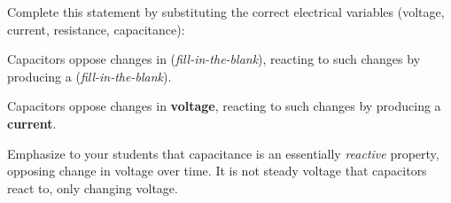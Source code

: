 

Complete this statement by substituting the correct electrical variables (voltage, current, resistance, capacitance):

\vskip 10pt {\narrower \noindent \baselineskip5pt
Capacitors oppose changes in ({\it fill-in-the-blank}), reacting to such changes by producing a ({\it fill-in-the-blank}).
\par} \vskip 10pt







Capacitors oppose changes in {\bf voltage}, reacting to such changes by producing a {\bf current}.







Emphasize to your students that capacitance is an essentially {\it reactive} property, opposing change in voltage over time.  It is not steady voltage that capacitors react to, only changing voltage.




